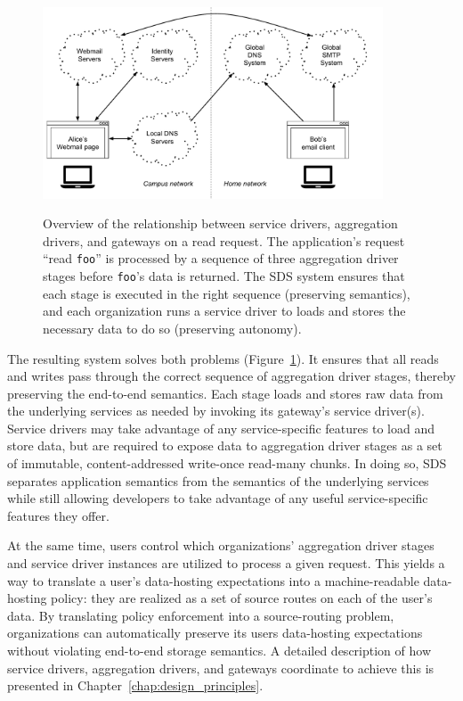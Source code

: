 \begin{figure}[h]
   \caption{Overview of the relationship between service drivers, aggregation
   drivers, and gateways on a read request.  The application's request ``read \texttt{foo}'' is
   processed by a sequence of three aggregation driver stages before
   \texttt{foo}'s data is returned.  The SDS system ensures that each stage is
   executed in the right sequence (preserving semantics),
   and each organization runs a service driver to loads and stores the
   necessary data to do so (preserving autonomy).}
   \centering
   \includegraphics[width=0.9\textwidth,page=33]{figures/dissertation-figures}
   \label{fig:chap1-sds-implementation-overview}
\end{figure}

The resulting system solves both problems
(Figure~\ref{fig:chap1-sds-implementation-overview}).
It ensures that all reads and writes pass through the
correct sequence of aggregation driver
stages, thereby preserving the end-to-end semantics.  Each stage
loads and stores raw data from the underlying services as needed
by invoking its gateway's service driver(s).  Service drivers may take advantage
of any service-specific features to load and store data, but are required to
expose data to aggregation driver stages as a set of immutable,
content-addressed write-once read-many chunks.  In doing so, SDS separates
application semantics from the semantics of the underlying services while still
allowing developers to take advantage of any useful service-specific
features they offer.

At the same time, users 
control which organizations' aggregation driver stages and service driver
instances are utilized to process a given request.  This yields a way to
translate a user's data-hosting expectations into a
machine-readable data-hosting policy:  they are realized as a set of source
routes on each of the user's data.  By translating policy enforcement into
a source-routing problem, organizations can automatically
preserve its users data-hosting expectations without
violating end-to-end storage semantics.  A detailed description
of how service drivers, aggregation
drivers, and gateways coordinate to achieve this is presented in
Chapter~\ref{chap:design_principles}.

